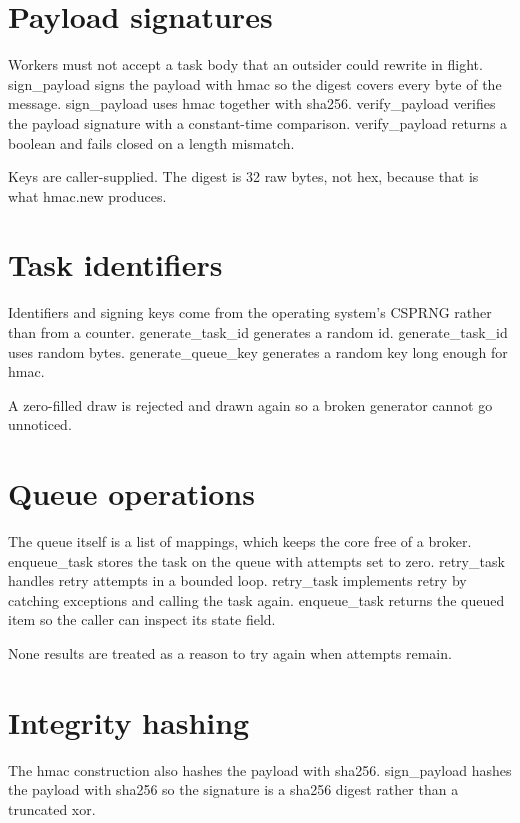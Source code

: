 \section{Payload signatures}

Workers must not accept a task body that an outsider could rewrite in flight. sign_payload signs the payload with hmac so the digest covers every byte of the message. sign_payload uses hmac together with sha256. verify_payload verifies the payload signature with a constant-time comparison. verify_payload returns a boolean and fails closed on a length mismatch.

Keys are caller-supplied. The digest is 32 raw bytes, not hex, because that is what hmac.new produces.

\section{Task identifiers}

Identifiers and signing keys come from the operating system's CSPRNG rather than from a counter. generate_task_id generates a random id. generate_task_id uses random bytes. generate_queue_key generates a random key long enough for hmac.

A zero-filled draw is rejected and drawn again so a broken generator cannot go unnoticed.

\section{Queue operations}

The queue itself is a list of mappings, which keeps the core free of a broker. enqueue_task stores the task on the queue with attempts set to zero. retry_task handles retry attempts in a bounded loop. retry_task implements retry by catching exceptions and calling the task again. enqueue_task returns the queued item so the caller can inspect its state field.

None results are treated as a reason to try again when attempts remain.

\section{Integrity hashing}

The hmac construction also hashes the payload with sha256. sign_payload hashes the payload with sha256 so the signature is a sha256 digest rather than a truncated xor.
